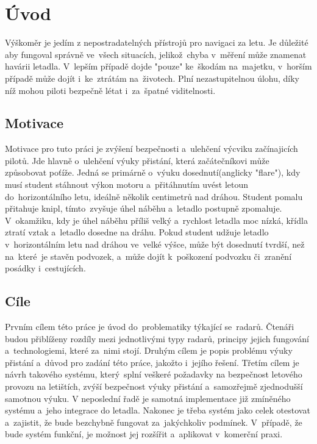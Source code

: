 
\newtheorem{definice}{Definice}

\chapter{Úvod}\label{uvod}
	Výškoměr je jedím z nepostradatelných přístrojů pro navigaci za letu. Je důležité aby fungoval správně ve~všech situacích, jelikož~chyba v~měření může znamenat havárii letadla. V~lepším případě dojde "pouze" ke~škodám na~majetku, v~horším případě může dojít i~ke~ztrátám na~životech. Plní nezastupitelnou úlohu, díky níž mohou piloti bezpečně létat i~za~špatné viditelnosti.
	
	\section{Motivace}\label{uvod::motivace}
		Motivace pro tuto práci je zvýšení bezpečnosti a~ulehčení výcviku začínajicích pilotů. Jde hlavně o~ulehčení výuky přistání, která začátečníkovi může způsobovat poťíže. Jedná se primárně o~výuku dosednutí(anglicky "flare"), kdy musí student stáhnout výkon motoru a~přitáhnutím uvést letoun do~horizontálního letu, ideálně několik centimetrů nad dráhou. Student pomalu přitahuje knipl, tímto~zvyšuje úhel náběhu a~letadlo postupně zpomaluje. V~okamžiku, kdy je úhel náběhu příliš velký a~rychlost letadla moc nízká, křídla ztratí vztak a~letadlo dosedne na dráhu. Pokud student udžuje letadlo v~horizontálním letu nad dráhou ve~velké výšce, může být dosednutí tvrdší, než na~které~je stavěn podvozek, a~může dojít k~poškození podvozku či~zranění posádky i~cestujících.
	
	\section{Cíle}\label{uvod::cile}
		Prvním cílem této práce je úvod do~problematiky týkající se~radarů. Čtenáři budou přiblíženy rozdíly mezi jednotlivými typy radarů, principy jejich fungování a~technologiemi, které za~nimi stojí. Druhým cílem je popis problému výuky přistání a~důvod pro zadání této práce, jakožto i~jejího řešení. Třetím cílem je návrh takového systému, který~splní veškeré požadavky na bezpečnost letového provozu na letištích, zvýší bezpečnost výuky přistání a~samozřejmě zjednodušší samotnou výuku. V neposlední řadě je samotná implementace již zmíněného systému a~jeho integrace do letadla. Nakonec je třeba systém jako celek otestovat a~zajistit, že bude bezchybně fungovat za~jakýchkoliv podmínek. V~případě, že bude systém funkční, je možnost jej rozšířit a~aplikovat v~komerční praxi. 


